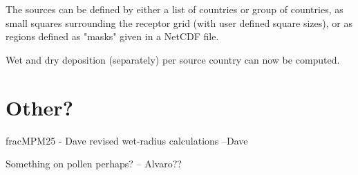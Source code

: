 The sources can be defined by either a list of countries or group of countries, as small squares surrounding the receptor grid (with user defined square sizes), or as regions defined as "masks" given in a NetCDF file.

Wet and dry deposition (separately) per source country can now be computed.


\section{Other?}
\label{sec:updateOther}

fracMPM25 - Dave
revised wet-radius calculations --Dave

Something on pollen perhaps? -- Alvaro??



\clearpage
\renewcommand\bibname{References}      %

